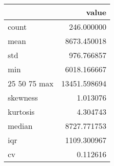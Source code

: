 \begin{tabular}{lr}
\toprule
 & value \\
\midrule
count & 246.000000 \\
mean & 8673.450018 \\
std & 976.766857 \\
min & 6018.166667 \\
25%
50%
75%
max & 13451.598694 \\
skewness & 1.013076 \\
kurtosis & 4.304743 \\
median & 8727.771753 \\
iqr & 1109.300967 \\
cv & 0.112616 \\
\bottomrule
\end{tabular}
